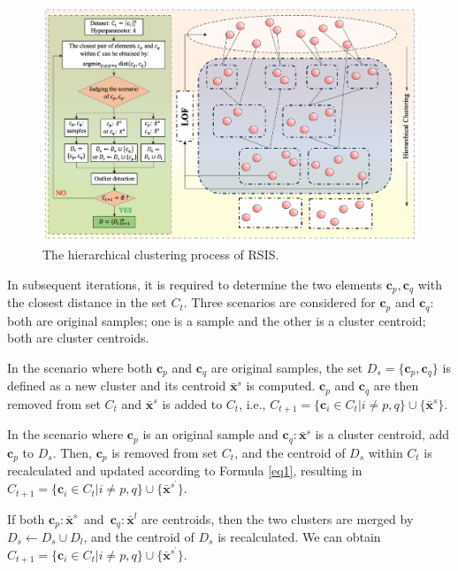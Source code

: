 \documentclass[final,3p,times]{elsarticle}
\begin{document}
\begin{figure}[t!]
  \centering
  \includegraphics[scale=0.51]{Fig2.png}
  \caption{The hierarchical clustering process of RSIS.}
  \label{Fig2}
\end{figure}

In subsequent iterations, it is required to determine the two 
elements $\boldsymbol{c}_p,\boldsymbol{c}_q$ with the closest 
distance in the set $C_t$. Three scenarios are considered 
for $\boldsymbol{c}_p$ and $\boldsymbol{c}_q$: both are 
original samples; one is a sample and the other is a cluster 
centroid; both are cluster centroids.

In the scenario where both $\boldsymbol{c}_p$ and $
\boldsymbol{c}_q$ are original samples, the set $D_s=\{
  \boldsymbol{c}_p,\boldsymbol{c}_q\}$ is defined as a new cluster 
  and its centroid $\bar{\boldsymbol{x}}^s$ is computed. 
  $\boldsymbol{c}_p$ and $\boldsymbol{c}_q$ are then removed 
  from set $C_t$ and $\bar{\boldsymbol{x}}^s$ is added to $C_t$, i.e.,
   $C_{t+1}=\{\boldsymbol{c}_i \in C_{t} | i \neq p, q\} \cup 
   \{\bar{\boldsymbol{x}}^s\}$.

In the scenario where $\boldsymbol{c}_p$ is an original sample and 
$\boldsymbol{c}_q:{\bar{\boldsymbol{x}}^s}$ is a cluster centroid, 
add $\boldsymbol{c}_p$ to $D_s$. Then, $\boldsymbol{c}_p$ is removed 
from set $C_t$, and the centroid of $D_s$ within $C_t$ is 
recalculated and updated according to Formula \eqref{eq1}, resulting in 
$C_{t+1}=\{\boldsymbol{c}_i \in C_{t} | i \neq p, q\}\cup \{ 
  \bar{\boldsymbol{x}}^{s^\prime} \}$.

If both $\boldsymbol{c}_p:{\bar{\boldsymbol{x}}^s}$ and $
\boldsymbol{c}_q:{\bar{\boldsymbol{x}}^l}$ are centroids, then 
the two clusters are merged by $D_s \leftarrow D_s  
{\cup}  D_l$, and the centroid of $D_s$ is recalculated. We can 
obtain $C_{t+1}=\{\boldsymbol{c}_i \in C_{t} | i \neq p, q\} \cup \{
  \bar{\boldsymbol{x}}^{s^\prime}\}$.
\end{document}
